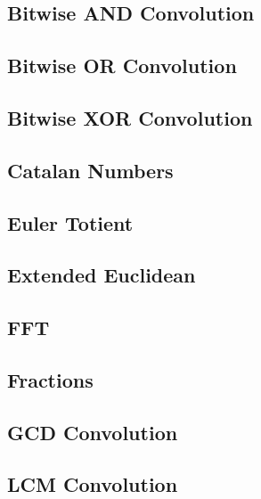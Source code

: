 \subsection{Bitwise AND Convolution}
\raggedbottom
\hrulefill
\subsection{Bitwise OR Convolution}
\raggedbottom
\hrulefill
\subsection{Bitwise XOR Convolution}
\raggedbottom
\hrulefill
\subsection{Catalan Numbers}
\raggedbottom
\hrulefill
\subsection{Euler Totient}
\raggedbottom
\hrulefill
\subsection{Extended Euclidean}
\raggedbottom
\hrulefill
\subsection{FFT}
\raggedbottom
\hrulefill
\subsection{Fractions}
\raggedbottom
\hrulefill
\subsection{GCD Convolution}
\raggedbottom
\hrulefill
\subsection{LCM Convolution}
\raggedbottom
\hrulefill
